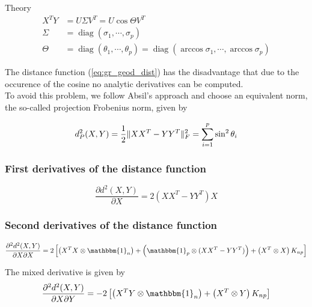 \begin{chapter}{Theory}
\begin{align}
    X^TY &= U\Sigma V^T = U\cos\Theta V^T\\
    \Sigma &= \operatorname{diag} (\sigma_1,\cdots,\sigma_p)\\
    \Theta &= \operatorname{diag} (\theta_1,\cdots,\theta_p) = \operatorname{diag} (\arccos\sigma_1,\cdots,\arccos\sigma_p)
\end{align}

The distance function (\ref{eq:gr_geod_dist}) has the disadvantage that due to the occurence of the cosine no analytic derivatives can be computed.\\

To avoid this problem, we follow Absil's \cite{AbsilGrassmann} approach and choose an equivalent norm, the so-called projection Frobenius norm, given by

\begin{equation}
    d_P^2(X,Y) = \frac{1}{2}\| XX^T-YY^T \|_{F}^{2} = \sum_{i=1}^p\sin^2\theta_i
\end{equation}




\subsubsection{First derivatives of the distance function} %
\label{ssub:First derivatives of the distance function}

\begin{equation}
    \label{eq:gr_x_der}
    \frac{\partial d^2(X,Y)}{\partial X} = 2\left(XX^T-YY^T\right)X
\end{equation}



\subsubsection{Second derivatives of the distance function} %
\label{ssub:Second derivatives of the distance function}

\begin{equation}
    \label{eq:gr_xx_der}
    \frac{\partial^2 d^2(X,Y)}{\partial X\partial X} = 2
    \left[
	\left(X^TX\otimes \mathbbm{1}_{n}\right) 
	+ \left(\mathbbm{1}_p\otimes (XX^T-YY^T)\right)
	+ \left(X^T\otimes X\right)K_{np}
    \right]
\end{equation}

The mixed derivative is given by
\begin{equation}
    \label{eq:gr_xy_der}
    \frac{\partial^2 d^2(X,Y)}{\partial X\partial Y} = -2\left[\left(X^TY\otimes \mathbbm{1}_{n}\right) + \left(X^T\otimes Y\right)K_{np}\right]
\end{equation}



\end{chapter}
